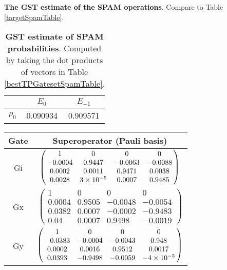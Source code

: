 {\begin{table}[h]
\begin{center}
\caption{\textbf{The GST estimate of the SPAM operations}.  Compare to Table \ref{targetSpamTable}.\label{bestTPGatesetSpamTable}}
\end{center}
\end{table}

\begin{table}[h]
\begin{center}
\begin{tabular}[l]{|c|c|c|}
\hline
 & $E_{0}$ & $E_{-1}$ \\ \hline
$\rho_{0}$ & 0.090934 & 0.909571 \\ \hline
\end{tabular}

\caption{\textbf{GST estimate of SPAM probabilities}.  Computed by taking the dot products of vectors in Table \ref{bestTPGatesetSpamTable}.\label{bestTPGatesetSpamParametersTable}}
\end{center}
\end{table}

\begin{table}[h]
\begin{center}
\begin{tabular}[l]{|c|c|}
\hline
Gate & Superoperator (Pauli basis) \\ \hline
Gi & $ \left(\!\!\begin{array}{cccc}
1 & 0 & 0 & 0 \\ 
-0.0004 & 0.9447 & -0.0063 & -0.0088 \\ 
0.0002 & 0.0011 & 0.9471 & 0.0038 \\ 
0.0028 & 3\times 10^{-5} & 0.0007 & 0.9485
 \end{array}\!\!\right) $
 \\ \hline
Gx & $ \left(\!\!\begin{array}{cccc}
1 & 0 & 0 & 0 \\ 
0.0004 & 0.9505 & -0.0048 & -0.0054 \\ 
0.0382 & 0.0007 & -0.0002 & -0.9483 \\ 
0.04 & 0.0007 & 0.9498 & -0.0019
 \end{array}\!\!\right) $
 \\ \hline
Gy & $ \left(\!\!\begin{array}{cccc}
1 & 0 & 0 & 0 \\ 
-0.0383 & -0.0004 & -0.0043 & 0.948 \\ 
0.0002 & 0.0016 & 0.9512 & 0.0017 \\ 
0.0393 & -0.9498 & -0.0059 & -4\times 10^{-5}
 \end{array}\!\!\right) $
 \\ \hline
\end{tabular}


\end{center}
\end{table}}
